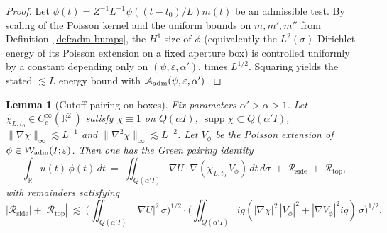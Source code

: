 \documentclass[11pt]{amsart}
\newtheorem{lemma}[theorem]{Lemma}
\theoremstyle{definition}
\theoremstyle{remark}
\newcommand{\R}{\mathbb{R}}
\begin{document}
\begin{proof}
Let \(\phi(t)=Z^{-1}L^{-1}\psi((t-t_0)/L)m(t)\) be an admissible test.
By scaling of the Poisson kernel and the uniform bounds on \(m,m',m''\) from Definition~\ref{def:adm-bumps}, the \(H^1\)-size of \(\phi\) (equivalently the \(L^2(\sigma)\) Dirichlet energy of its Poisson extension on a fixed aperture box) is controlled uniformly by a constant depending only on \((\psi,\varepsilon,\alpha')\), times \(L^{1/2}\).
Squaring yields the stated \(\lesssim L\) energy bound with \(\mathcal A_{\rm adm}(\psi,\varepsilon,\alpha')\).
\end{proof}
\begin{lemma}[Cutoff pairing on boxes]\label{lem:cutoff-pairing}
Fix parameters \(\alpha'>\alpha>1\).
Let \(\chi_{L,t_0}\in C_c^\infty(\R^2_+)\) satisfy \(\chi\equiv1\) on \(Q(\alpha I)\), \(\operatorname{supp}\chi\subset Q(\alpha'I)\), \(\|\nabla\chi\|_\infty\lesssim L^{-1}\) and \(\|\nabla^2\chi\|_\infty\lesssim L^{-2}\).
Let \(V_\phi\) be the Poisson extension of \(\phi\in \mathcal W_{\rm adm}(I;\varepsilon)\).
Then one has the Green pairing identity
\[
 \int_{\R} u(t)\,\phi(t)\,dt
 \ =\ \iint_{Q(\alpha'I)} \nabla U\cdot \nabla(\chi_{L,t_0}\, V_\phi)\,dt\,d\sigma\ +\ \mathcal R_{\mathrm{side}}\ +\ \mathcal R_{\mathrm{top}},
\]
with remainders satisfying
\[
 |\mathcal R_{\mathrm{side}}|+|\mathcal R_{\mathrm{top}}|
 \ \lesssim\ \Big(\iint_{Q(\alpha'I)} |\nabla U|^2\,\sigma\Big)^{1/2}
               \cdot \Big(\iint_{Q(\alpha'I)} ig(|\nabla\chi|^2\,|V_\phi|^2+|\nabla V_\phi|^2ig)\,\sigma\Big)^{1/2}.
\]
\end{lemma}
\end{document}
